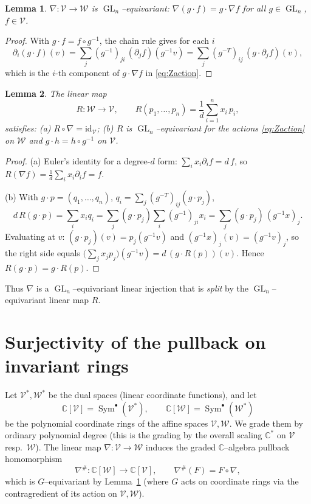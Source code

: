 \documentclass{amsart}
\newtheorem{lemma}{Lemma}
\theoremstyle{definition}
\DeclareMathOperator{\GL}{GL}
\DeclareMathOperator{\Sym}{Sym}
\newcommand{\CC}{\mathbb{C}}
\newcommand{\nab}{\nabla}
\begin{document}
\begin{lemma}\label{lem:nabeq}
$\nab\colon \mathcal V\to\mathcal W$ is $\GL_n$--equivariant: $\nab(g\cdot f)=g\cdot\nab f$
for all $g\in\GL_n$, $f\in\mathcal V$.
\end{lemma}

\begin{proof}
With $g\cdot f=f\circ g^{-1}$, the chain rule gives for each $i$
\[
\partial_i(g\cdot f)(v)=\sum_j (g^{-1})_{ji}\,(\partial_j f)(g^{-1}v)
=\sum_j (g^{-T})_{ij}\,(g\cdot\partial_j f)(v),
\]
which is the $i$-th component of $g\cdot\nab f$ in \eqref{eq:Zaction}.
\end{proof}

\begin{lemma}\label{lem:euler}
The linear map
\[
R\colon \mathcal W\to\mathcal V,\qquad R(p_1,\dots,p_n)=\frac1d\sum_{i=1}^n x_i\,p_i,
\]
satisfies:
\textup{(a)} $R\circ\nab=\mathrm{id}_{\mathcal V}$;
\textup{(b)} $R$ is $\GL_n$--equivariant for the actions \eqref{eq:Zaction} on $\mathcal W$
and $g\cdot h=h\circ g^{-1}$ on $\mathcal V$.
\end{lemma}

\begin{proof}
(a) Euler's identity for a degree-$d$ form: $\sum_i x_i\partial_i f=d\,f$, so
$R(\nab f)=\tfrac1d\sum_i x_i\partial_i f=f$.

(b) With $g\cdot p=(q_1,\dots,q_n)$, $q_i=\sum_j(g^{-T})_{ij}(g\cdot p_j)$,
\[
d\,R(g\cdot p)=\sum_i x_i q_i=\sum_j (g\cdot p_j)\sum_i (g^{-1})_{ji}x_i
=\sum_j (g\cdot p_j)\,(g^{-1}x)_j .
\]
Evaluating at $v$: $(g\cdot p_j)(v)=p_j(g^{-1}v)$ and $(g^{-1}x)_j(v)=(g^{-1}v)_j$, so the
right side equals $\big(\sum_j x_j p_j\big)(g^{-1}v)=d\,(g\cdot R(p))(v)$. Hence
$R(g\cdot p)=g\cdot R(p)$.
\end{proof}

Thus $\nab$ is a $\GL_n$--equivariant linear injection that is \emph{split} by the
$\GL_n$--equivariant linear map $R$.

\section{Surjectivity of the pullback on invariant rings}\label{sec:inv}

Let $\mathcal V^{*},\mathcal W^{*}$ be the dual spaces (linear coordinate functions), and let
\[
\CC[\mathcal V]=\Sym^{\bullet}(\mathcal V^{*}),\qquad \CC[\mathcal W]=\Sym^{\bullet}(\mathcal W^{*})
\]
be the polynomial coordinate rings of the affine spaces $\mathcal V,\mathcal W$. We grade them
by ordinary polynomial degree (this is the grading by the overall scaling $\CC^{*}$ on
$\mathcal V$ resp.\ $\mathcal W$). The linear map $\nab\colon \mathcal V\to\mathcal W$ induces
the graded $\CC$--algebra pullback homomorphism
\[
\nab^{\#}\colon \CC[\mathcal W]\to\CC[\mathcal V],\qquad \nab^{\#}(F)=F\circ\nab,
\]
which is $G$--equivariant by Lemma~\ref{lem:nabeq} (where $G$ acts on coordinate rings via the
contragredient of its action on $\mathcal V,\mathcal W$).
\end{document}
